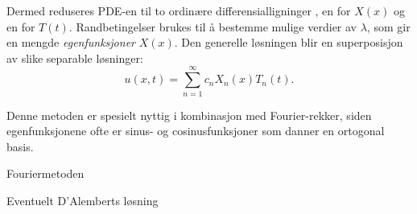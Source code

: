     Dermed reduseres PDE-en til to ordinære differensialligninger , en for $X(x)$ og en for $T(t)$. Randbetingelser brukes til å bestemme mulige verdier av $\lambda$, som gir en mengde \emph{egenfunksjoner} $X(x)$. Den generelle løsningen blir en superposisjon av slike separable løsninger:
    \[
    u(x,t) = \sum_{n=1}^\infty c_n X_n(x) T_n(t).
    \]

    Denne metoden er spesielt nyttig i kombinasjon med Fourier-rekker, siden egenfunksjonene ofte er sinus- og cosinusfunksjoner som danner en ortogonal basis.


    Fouriermetoden

    Eventuelt D’Alemberts løsning

